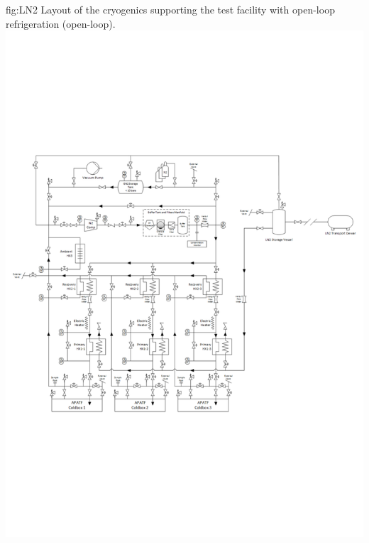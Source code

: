 \begin{dunefigure}{fig:LN2}
  {Layout of the cryogenics supporting the  test facility with open-loop refrigeration (open-loop).}
\includegraphics[width=.98\textwidth]{graphics/Cryo-cold-box-LN2.pdf}
\end{dunefigure}



